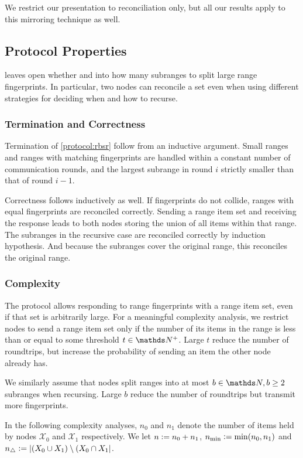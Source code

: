 \documentclass[conference]{IEEEtran}
\newcommand{\peer}[1]{\ensuremath{\mathcal{X}_{#1}}}
\begin{document}
We restrict our presentation to reconciliation only, but all our results apply to this mirroring technique as well.

\subsection{Protocol Properties}
 leaves open whether and into how many subranges to split large range fingerprints. In particular, two nodes can reconcile a set even when using different strategies for deciding when and how to recurse.

\subsubsection{Termination and Correctness}

Termination of \cref{protocol:rbsr} follow from an inductive argument. Small ranges and ranges with matching fingerprints are handled within a constant number of communication rounds, and the largest subrange in round $i$ strictly smaller than that of round $i - 1$.

Correctness follows inductively as well. If fingerprints do not collide, ranges with equal fingerprints are reconciled correctly. Sending a range item set and receiving the response leads to both nodes storing the union of all items within that range. The subranges in the recursive case are reconciled correctly by induction hypothesis. And because the subranges cover the original range, this reconciles the original range.

\subsubsection{Complexity}

The protocol allows responding to range fingerprints with a range item set, even if that set is arbitrarily large. For a meaningful complexity analysis, we restrict nodes to send a range item set only if the number of its items in the range is less than or equal to some threshold $t \in \Np$. Large $t$ reduce the number of roundtrips, but increase the probability of sending an item the other node already has.

We similarly assume that nodes split ranges into at most $b \in \N, b \geq 2$ subranges when recursing. Large $b$ reduce the number of roundtrips but transmit more fingerprints.

In the following complexity analyses, $n_0$ and $n_1$ denote the number of items held by nodes \peer{0} and \peer{1} respectively. We let $n \vcentcolon= n_0 + n_1$, $n_{\min} \vcentcolon= \min(n_0, n_1)$ and $n_{\triangle} \vcentcolon= |{(X_0 \cup X_1) \setminus (X_0 \cap X_1}|$.
\end{document}
